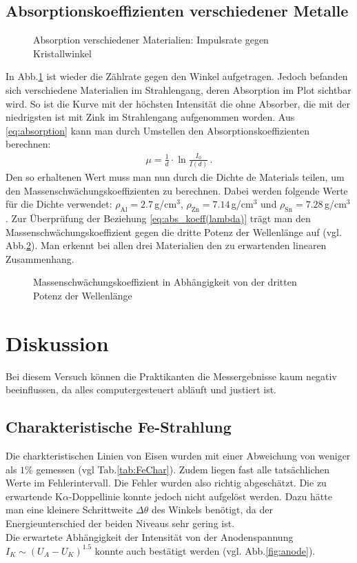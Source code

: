 \documentclass[12pt,a4paper,titlepage,headinclude,bibtotoc]{scrartcl}
\begin{document}
\subsection{Absorptionskoeffizienten verschiedener Metalle}
\begin{figure}[!htb]
	\centering
	
	\caption{Absorption verschiedener Materialien: Impulsrate gegen Kristallwinkel}
	\label{fig:messung5}
\end{figure}
In Abb.\ref{fig:messung5} ist wieder die Zählrate gegen den Winkel aufgetragen.
Jedoch befanden sich verschiedene Materialien im Strahlengang, deren Absorption im Plot sichtbar wird.
So ist die Kurve mit der höchsten Intensität die ohne Absorber, die mit der niedrigsten ist mit Zink im Strahlengang aufgenommen worden.
Aus \eqref{eq:absorption} kann man durch Umstellen den Absorptionskoeffizienten berechnen:
\begin{align}
	\mu=\frac{1}{d}\cdot\ln\frac{I_0}{I(d)}\,.
\end{align}
Den so erhaltenen Wert muss man nun durch die Dichte de Materials teilen, um den Massenschwächungskoeffizienten zu berechnen.
Dabei werden folgende Werte für die Dichte verwendet: $\rho_\text{Al}=2.7\,$g/cm$^3$, $\rho_\text{Zn}=7.14\,$g/cm$^3$ und $\rho_\text{Sn}=7.28\,$g/cm$^3$.
Zur Überprüfung der Beziehung \eqref{eq:abs_koeff(lambda)} trägt man den Massenschwächungskoeffizient gegen die dritte Potenz der Wellenlänge auf (vgl. Abb.\ref{fig:abs_koeff(lambda)}).
Man erkennt bei allen drei Materialien den zu erwartenden linearen Zusammenhang.
\begin{figure}[!htb]
	\centering
	
	\caption{Massenschwächungskoeffizient in Abhängigkeit von der dritten Potenz der Wellenlänge}
	\label{fig:abs_koeff(lambda)}
\end{figure}

\section{Diskussion}
\label{sec:diskussion}
Bei diesem Versuch können die Praktikanten die Messergebnisse kaum negativ beeinflussen, da alles computergesteuert abläuft und justiert ist.

\subsection{Charakteristische Fe-Strahlung}
Die charkteristischen Linien von Eisen wurden mit einer Abweichung von weniger als $1\%$ gemessen (vgl Tab.\ref{tab:FeChar}).
Zudem liegen fast alle tatsächlichen Werte im Fehlerintervall.
Die Fehler wurden also richtig abgeschätzt.
Die zu erwartende K$\alpha$-Doppellinie konnte jedoch nicht aufgelöst werden.
Dazu hätte man eine kleinere Schrittweite $\Delta\theta$ des Winkels benötigt, da der Energieunterschied der beiden Niveaus sehr gering ist.\\
Die erwartete Abhängigkeit der Intensität von der Anodenspannung $I_K\sim (U_A-U_K)^{1.5}$ konnte auch bestätigt werden (vgl. Abb.\ref{fig:anode}).
\end{document}
